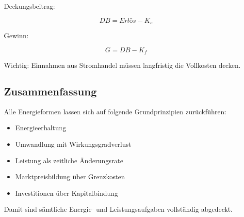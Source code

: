 Deckungsbeitrag:

\[
DB = Erlös - K_v
\]

Gewinn:

\[
G = DB - K_f
\]

Wichtig:
Einnahmen aus Stromhandel müssen langfristig
die Vollkosten decken.

\subsection{Zusammenfassung}

Alle Energieformen lassen sich auf folgende Grundprinzipien zurückführen:

\begin{itemize}
\item Energieerhaltung
\item Umwandlung mit Wirkungsgradverlust
\item Leistung als zeitliche Änderungsrate
\item Marktpreisbildung über Grenzkosten
\item Investitionen über Kapitalbindung
\end{itemize}

Damit sind sämtliche Energie- und Leistungsaufgaben vollständig abgedeckt.